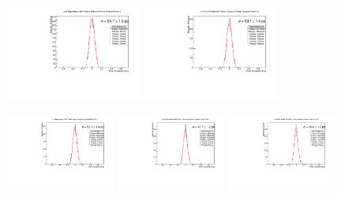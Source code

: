 \documentclass[12pt]{article}
\begin{document}
\begin{figure}[h]
\centering
	\includegraphics[width=0.4\textwidth]{SKIROC/SKIROC_1_Pixels50.pdf}
	\includegraphics[width=0.4\textwidth]{SKIROC/SKIROC_2_Pixels50.pdf}
	
	\includegraphics[width=0.32\textwidth]{SKIROC/SKIROC_3_Pixels50.pdf}
	\includegraphics[width=0.32\textwidth]{SKIROC/SKIROC_4_Pixels50.pdf}
	\includegraphics[width=0.32\textwidth]{SKIROC/SKIROC_5_Pixels50.pdf}
	

\end{figure}
\end{document}

